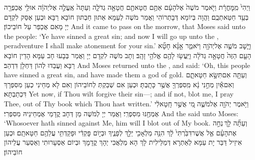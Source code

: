 {וַיְהִי֙ מִֽמׇּחֳרָ֔ת וַיֹּ֤אמֶר מֹשֶׁה֙ אֶל\maqqaf הָעָ֔ם אַתֶּ֥ם חֲטָאתֶ֖ם חֲטָאָ֣ה גְדֹלָ֑ה וְעַתָּה֙ אֶֽעֱלֶ֣ה אֶל\maqqaf יְהֹוָ֔ה אוּלַ֥י אֲכַפְּרָ֖ה בְּעַ֥ד חַטַּאתְכֶֽם׃}
{וַהֲוָה בְּיוֹמָא דְּבָתְרוֹהִי וַאֲמַר מֹשֶׁה לְעַמָּא אַתּוּן חַבְתּוּן חוֹבָא רַבָּא וּכְעַן אֶסַּק לִקְדָם יְיָ מָאִם אֲכַפַּר עַל חוֹבֵיכוֹן׃}
{And it came to pass on the morrow, that Moses said unto the people: ‘Ye have sinned a great sin; and now I will go up unto the \lord, peradventure I shall make atonement for your sin.’}{}
{וַיָּ֧שׇׁב מֹשֶׁ֛ה אֶל\maqqaf יְהֹוָ֖ה וַיֹּאמַ֑ר אָ֣נָּ֗א חָטָ֞א הָעָ֤ם הַזֶּה֙ חֲטָאָ֣ה גְדֹלָ֔ה וַיַּֽעֲשׂ֥וּ לָהֶ֖ם אֱלֹהֵ֥י זָהָֽב׃}
{וְתָב מֹשֶׁה לִקְדָם יְיָ וַאֲמַר בְּבָעוּ חָב עַמָּא הָדֵין חוֹבָא רַבָּא וַעֲבַדוּ לְהוֹן דַּחְלָן דִּדְהַב׃}
{And Moses returned unto the \lord, and said: ‘Oh, this people have sinned a great sin, and have made them a god of gold.}{}
{וְעַתָּ֖ה אִם\maqqaf תִּשָּׂ֣א חַטָּאתָ֑ם וְאִם\maqqaf אַ֕יִן מְחֵ֣נִי נָ֔א מִֽסִּפְרְךָ֖ אֲשֶׁ֥ר כָּתָֽבְתָּ׃}
{וּכְעַן אִם שְׁבַקְתְּ לְחוֹבֵיהוֹן וְאִם לָא מְחֵינִי כְעַן מִסִּפְרָךְ דִּכְתַבְתָּא׃}
{Yet now, if Thou wilt forgive their sin—; and if not, blot me, I pray Thee, out of Thy book which Thou hast written.’}{}
{וַיֹּ֥אמֶר יְהֹוָ֖ה אֶל\maqqaf מֹשֶׁ֑ה מִ֚י אֲשֶׁ֣ר חָֽטָא\maqqaf לִ֔י אֶמְחֶ֖נּוּ מִסִּפְרִֽי׃}
{וַאֲמַר יְיָ לְמֹשֶׁה מַן דְּחָב קֳדָמַי אֶמְחֵינֵיהּ מִסִּפְרִי׃}
{And the \lord\space said unto Moses: ‘Whosoever hath sinned against Me, him will I blot out of My book.}{}
{וְעַתָּ֞ה לֵ֣ךְ \legarmeh  נְחֵ֣ה אֶת\maqqaf הָעָ֗ם אֶ֤ל אֲשֶׁר\maqqaf דִּבַּ֙רְתִּי֙ לָ֔ךְ הִנֵּ֥ה מַלְאָכִ֖י יֵלֵ֣ךְ לְפָנֶ֑יךָ וּבְי֣וֹם פׇּקְדִ֔י וּפָקַדְתִּ֥י עֲלֵהֶ֖ם חַטָּאתָֽם׃}
{וּכְעַן אִיזֵיל דַּבַּר יָת עַמָּא לְאַתְרָא דְּמַלֵּילִית לָךְ הָא מַלְאֲכִי יְהָךְ קֳדָמָךְ וּבְיוֹם אַסְעָרוּתִי וְאַסְעַר עֲלֵיהוֹן חוֹבֵיהוֹן׃}
